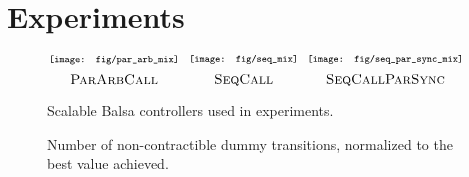 \section{Experiments}\label{se-exp}

\begin{figure*}[!tb]
\centering
    \phantom{\,}%
    \hfill%
    $\texttt{[image: fig/par\_arb\_mix]}
    \atop
    \mbox{\rule[1.3em]{0em}{0em}\ParArbCall}$%
    \hfill%
    $\texttt{[image: fig/seq\_mix]}
    \atop
    \mbox{\rule[1.3em]{0em}{0em}\SeqCall}$%
    \hfill%
    $\texttt{[image: fig/seq\_par\_sync\_mix]}
    \atop
    \mbox{\rule[1.3em]{0em}{0em}\SeqCallParSync}$%
    \hfill%
    \phantom{\,}%
    \\
    \caption{\label{fig:Scalable-Balsa-controllers}
        Scalable Balsa controllers used in experiments.
    }
\end{figure*}

\begin{figure*}[p]
\centering

    \hfill%
    \caption{\label{fi-exp}
        Number of non-contractible dummy transitions, normalized to the best value achieved.
    }
\end{figure*}

